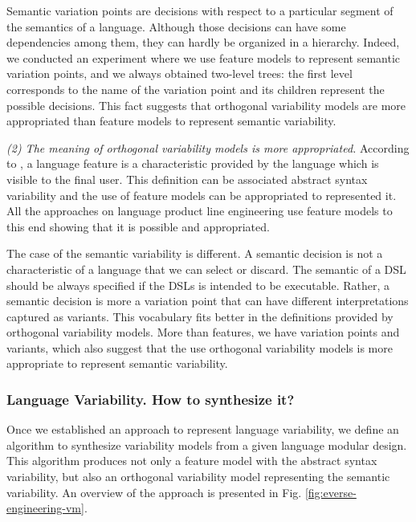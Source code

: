 Semantic variation points are decisions with respect to a particular segment of the semantics of a language. Although those decisions can have some dependencies among them, they can hardly be organized in a hierarchy. Indeed, we conducted an experiment where we use feature models to represent semantic variation points, and we always obtained two-level trees: the first level corresponds to the name of the variation point and its children represent the possible decisions. This fact suggests that orthogonal variability models are more appropriated than feature models to represent semantic variability.  

\vspace{2mm}
\textit{(2) The meaning of orthogonal variability models is more appropriated.} According to \cite{Liebig:2013}, a language feature is a characteristic provided by the language which is visible to the final user. This definition can be associated abstract syntax variability and the use of feature models can be appropriated to represented it. All the approaches on language product line engineering use feature models to this end showing that it is possible and appropriated. 

The case of the semantic variability is different. A semantic decision is not a characteristic of a language that we can select or discard. The semantic of a DSL should be always specified if the DSLs is intended to be executable. Rather, a semantic decision is more a variation point that can have different interpretations captured as variants. This vocabulary fits better in the definitions provided by orthogonal variability models. More than features, we have variation points and variants, which also suggest that the use orthogonal variability models is more appropriate to represent semantic variability.

\subsubsection{Language Variability. \textbf{How to synthesize it?}}

Once we established an approach to represent language variability, we define an algorithm to synthesize variability models from a given language modular design. This algorithm produces not only a feature model with the abstract syntax variability, but also an orthogonal variability model representing the semantic variability. An overview of the approach is presented in Fig. \ref{fig:everse-engineering-vm}. 

